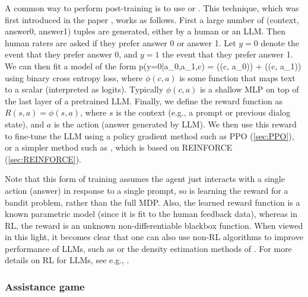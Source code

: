 A common way to perform post-training is to use
or .
This technique, which was first introduced in the  paper
\citep{instructGPT}, works as follows.
First a large number of (context, answer0, answer1) tuples are generated,
either by a human or an LLM.
Then human raters are asked  if they prefer answer 0 or answer 1.
Let $y=0$ denote the event that they prefer answer 0, and $y=1$ the event
that they prefer answer 1.
We can then fit a model of the form
\be
p(y=0|a_0,a_1,c) = 
{\exp(\phi(c, a_0)) + \exp(\phi(c, a_1))}
\ee
using binary cross entropy loss,
where $\phi(c,a)$ is some function that maps text to a
scalar (interpreted as logits).
Typically $\phi(c,a)$ is a shallow MLP on top of the last layer
of a pretrained LLM.
Finally, we define the reward function as
$R(s,a)=\phi(s,a)$,
where $s$ is the context (e.g., a prompt or previous dialog state),
and $a$ is the action (answer generated by LLM).
We then use this reward to fine-tune the LLM using
a policy gradient method such as PPO (\cref{sec:PPO}),
or a simpler method such as 
\citep{Ahmadian2024},
which is based on REINFORCE (\cref{sec:REINFORCE}).


Note that this form of training assumes the agent
just interacts with a single action (answer) in response to a single
prompt, so is learning the reward for a bandit problem, rather than the full MDP.
Also, the learned reward function is a
known parametric model (since it is fit to the human feedback data),
whereas in RL, the reward is
an unknown non-differentiable  blackbox function.
When viewed in this light, it becomes clear that one can also use
non-RL algorithms  to improve performance of LLMs,
such as  \citep{Rafailov2023}
or the density estimation methods of \citep{Dumoulin2024}.
For more details  on RL for LLMs,
see e.g., \citep{Kaufmann2023}.


\subsubsection{Assistance game}
\label{sec:assistance}

